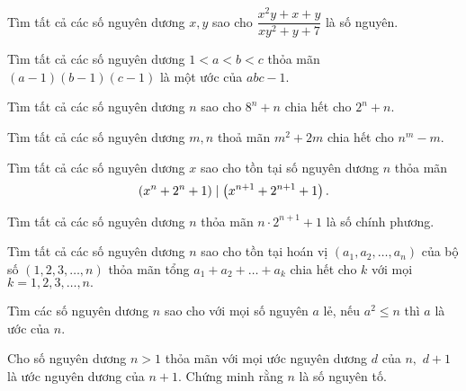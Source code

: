 \begin{btt}
Tìm tất cả các số nguyên dương $x,y$ sao cho $\dfrac{x^2y+x+y}{xy^2+y+7}$ là số nguyên.
\end{btt}

\begin{btt}
Tìm tất cả các số nguyên dương $1<a< b< c$ thỏa mãn $(a-1)(b-1)(c-1)$ là một ước của $abc-1.$
\end{btt}

\begin{btt}
Tìm tất cả các số nguyên dương $n$ sao cho $8^n+n$ chia hết cho $2^n+n$.
\end{btt}

\begin{btt}
Tìm tất cả các số nguyên dương $m,n$ thoả mãn $m^2+2m$ chia hết cho $n^m-m.$
\end{btt}

\begin{btt}
Tìm tất cả các số nguyên dương $x$ sao cho tồn tại số nguyên dương $n$ thỏa mãn \[\left(\displaystyle x^n+2^n+1 \right) \mid \left(\displaystyle x^{n+1}+2^{n+1}+1 \right). \]
\end{btt}

\begin{btt}
Tìm tất cả các số nguyên dương $n$ thỏa mãn $n\cdot 2^{n+1}+1$ là số chính phương.
\end{btt}

\begin{btt}
Tìm tất cả các số nguyên dương $n$ sao cho tồn tại hoán vị $\left(a_1, a_2, \ldots, a_{n}\right)$ của bộ số $(1,2,3, \ldots, n)$ thỏa mãn tổng $a_{1}+a_{2}+\ldots+a_{k}$ chia hết cho $k$ với mọi $k=1,2,3, \ldots, n .$
\end{btt}

\begin{btt}
Tìm các số nguyên dương $n$ sao cho với mọi số nguyên $a$ lẻ, nếu $a^2\leq n$ thì $a$ là ước của $n$.
\end{btt}

\begin{btt}
Cho số nguyên dương $n>1$ thỏa mãn với mọi ước nguyên dương $d$ của $n,$ $d+1$ là ước nguyên dương của $n+1.$ Chứng minh rằng $n$ là số nguyên tố.
\end{btt}

